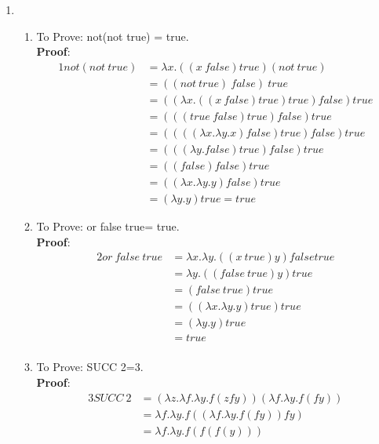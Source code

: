 \documentclass[11pt]{article}
\begin{document}
\begin{enumerate}
\item 
\begin{enumerate}
    \item To Prove: not(not true) = true.\\
          \textbf{Proof}: \begin{alignat*}{1}
                 not(not\:true)
                 &=  \lambda x.((x\:false)true)(not\:true) \\
                 &= ((not\:true)\:false)\:true \\
                &=  ((\lambda x.((x\:false) true) true)false) true \\
                 &= (((true\:false) true) false)true\\
                 &= ((((\lambda x. \lambda y.x) false) true)false) true\\
                &= (((\lambda y.false) true) false)true \\
                &= ((false) false) true \\
                &= ((\lambda x.\lambda y.y) false) true\\
                &= (\lambda y.y) true = true 
                \end{alignat*}
    \item To Prove: or false true= true.\\
          \textbf{Proof}:  \begin{alignat*}{2}
                or\:false\:true  &= \lambda x.\lambda y.((x\:true) y) false true \\
                    &= \lambda y.((false\:true) y) true\\
                    &= (false\:true) true\\
                    &= ((\lambda x.\lambda y.y) true) true\\
                    &= (\lambda y.y) true\\
                    &= true\\
            \end{alignat*}
    \item To Prove: SUCC 2=3.\\
          \textbf{Proof}:  \begin{alignat*}{3}
                SUCC\:2  &= (\lambda z. \lambda f. \lambda y. f (z f y))(\lambda f. \lambda y. f (f y))\\
                        &=  \lambda f. \lambda y. f ( (\lambda f. \lambda y. f (f y)) f y)\\
                        &= \lambda f. \lambda y. f ( f(f(y)))\\

\end{alignat*}
\end{enumerate}
\end{enumerate}
\end{document}
